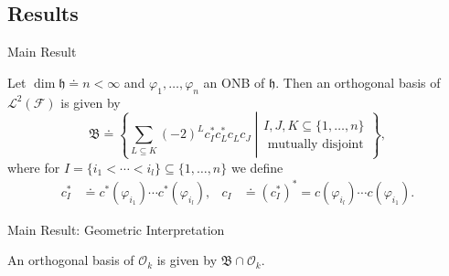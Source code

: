 \documentclass{beamer}
\newcommand{\HS}{{\mathcal{L}^2(\FockSpace)}}
\newcommand{\HSbasis}{\mathfrak{B}}
\newcommand{\HilbertSpace}{\ensuremath{\mathfrak{h}}}
\newcommand{\FockSpace}{\mathcal{F}}
\newcommand{\DensityMatrices}{\mathcal{D}}
\newcommand{\kbOp}[1][k]{{\ensuremath{\mathcal{O}_{#1}}}}
\begin{document}
\subsection{Results}
\begin{frame}{Main Result}
    \begin{theorem}
        Let $\dim\HilbertSpace\doteq n<\infty$ and $\varphi_1,\ldots,\varphi_n$ an ONB of $\HilbertSpace$.
        Then an orthogonal basis of $\HS$ is given by
        \begin{equation}
            \HSbasis\doteq\left\{
              \left.\sum_{L\subseteq K}(-2)^Lc_I^*c_L^*c_Lc_J\;\right|
            \begin{gathered}
                I,J,K\subseteq\{1,\ldots,n\}\\\text{ mutually disjoint}
            \end{gathered}
            \right\},
        \end{equation}
        where for $I=\{i_1<\cdots<i_l\}\subseteq\{1,\ldots,n\}$ we define
        \begin{align}
            c_I^*&\doteq c^*(\varphi_{i_1})\cdots c^*(\varphi_{i_l}),&
            c_I&\doteq\left(c_I^*\right)^*=c(\varphi_{i_l})\cdots c(\varphi_{i_1}).
        \end{align}
    \end{theorem}
\end{frame}

\begin{frame}{Main Result: Geometric Interpretation}
    \begin{corollary}
        An orthogonal basis of $\kbOp$ is given by $\HSbasis\cap\kbOp$.
    \end{corollary}
    \begin{figure}
\end{figure}
\end{frame}
\end{document}
